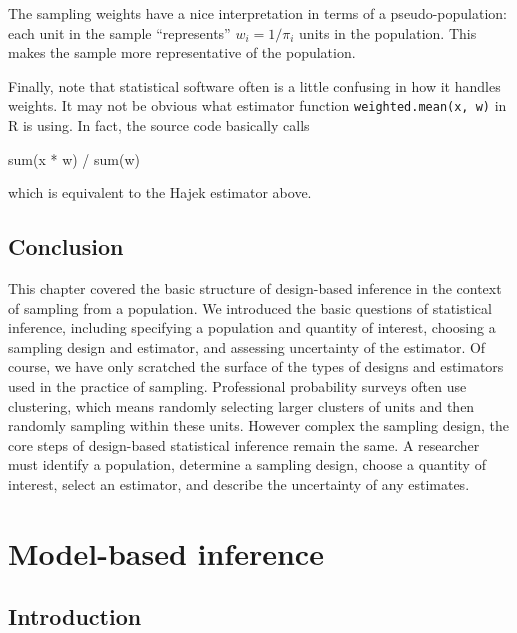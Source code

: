 \documentclass[
  letterpaper,
  DIV=11,
  numbers=noendperiod]{scrreprt}
\newenvironment{Shaded}{\begin{snugshade}}{\end{snugshade}}
\newcommand{\FunctionTok}[1]{\textcolor[rgb]{0.28,0.35,0.67}{#1}}
\newcommand{\NormalTok}[1]{\textcolor[rgb]{0.00,0.23,0.31}{#1}}
\newcommand{\SpecialCharTok}[1]{\textcolor[rgb]{0.37,0.37,0.37}{#1}}
\theoremstyle{definition}
\theoremstyle{definition}
\theoremstyle{plain}
\theoremstyle{remark}
\begin{document}
The sampling weights have a nice interpretation in terms of a
pseudo-population: each unit in the sample ``represents''
\(w_i = 1/\pi_i\) units in the population. This makes the sample more
representative of the population.

Finally, note that statistical software often is a little confusing in
how it handles weights. It may not be obvious what estimator function
\texttt{weighted.mean(x,\ w)} in R is using. In fact, the source code
basically calls

\begin{Shaded}
\begin{Highlighting}[]
\FunctionTok{sum}\NormalTok{(x }\SpecialCharTok{*}\NormalTok{ w) }\SpecialCharTok{/} \FunctionTok{sum}\NormalTok{(w)}
\end{Highlighting}
\end{Shaded}

which is equivalent to the Hajek estimator above.

\hypertarget{conclusion}{%
\section{Conclusion}\label{conclusion}}

This chapter covered the basic structure of design-based inference in
the context of sampling from a population. We introduced the basic
questions of statistical inference, including specifying a population
and quantity of interest, choosing a sampling design and estimator, and
assessing uncertainty of the estimator. Of course, we have only
scratched the surface of the types of designs and estimators used in the
practice of sampling. Professional probability surveys often use
clustering, which means randomly selecting larger clusters of units and
then randomly sampling within these units. However complex the sampling
design, the core steps of design-based statistical inference remain the
same. A researcher must identify a population, determine a sampling
design, choose a quantity of interest, select an estimator, and describe
the uncertainty of any estimates.

\hypertarget{model-based-inference}{%
\chapter{Model-based inference}\label{model-based-inference}}

\hypertarget{introduction-2}{%
\section{Introduction}\label{introduction-2}}
\end{document}
